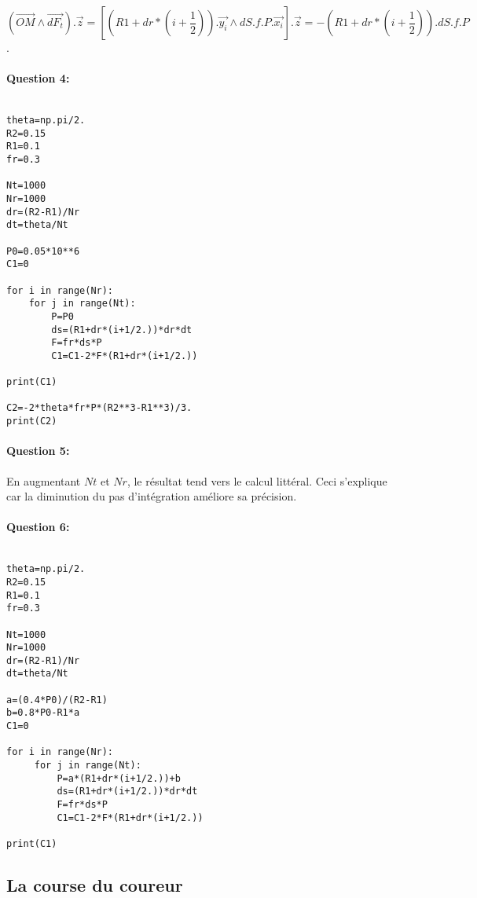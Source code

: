 $(\overrightarrow{OM}\wedge \overrightarrow{dF_t}).\overrightarrow{z}=\left[(R1+dr*(i+\dfrac{1}{2})).\overrightarrow{y_i}\wedge dS.f.P.\overrightarrow{x_i}\right].\overrightarrow{z}=-(R1+dr*(i+\dfrac{1}{2})).dS.f.P$.

\paragraph{Question 4:} 

\begin{verbatim}

theta=np.pi/2.
R2=0.15
R1=0.1
fr=0.3

Nt=1000
Nr=1000
dr=(R2-R1)/Nr
dt=theta/Nt

P0=0.05*10**6
C1=0

for i in range(Nr):
	for j in range(Nt):
		P=P0
		ds=(R1+dr*(i+1/2.))*dr*dt
		F=fr*ds*P
		C1=C1-2*F*(R1+dr*(i+1/2.))  
    
print(C1)

C2=-2*theta*fr*P*(R2**3-R1**3)/3.
print(C2)
\end{verbatim}



\paragraph{Question 5:} En augmentant $Nt$ et $Nr$, le résultat tend vers le calcul littéral. Ceci s'explique car la diminution du pas d'intégration améliore sa précision.

\paragraph{Question 6:} 

\begin{verbatim}

theta=np.pi/2.
R2=0.15
R1=0.1
fr=0.3

Nt=1000
Nr=1000
dr=(R2-R1)/Nr
dt=theta/Nt

a=(0.4*P0)/(R2-R1)
b=0.8*P0-R1*a
C1=0

for i in range(Nr):
     for j in range(Nt):
         P=a*(R1+dr*(i+1/2.))+b
         ds=(R1+dr*(i+1/2.))*dr*dt
         F=fr*ds*P
         C1=C1-2*F*(R1+dr*(i+1/2.))  
    
print(C1)
\end{verbatim}

\subsection{La course du coureur}

